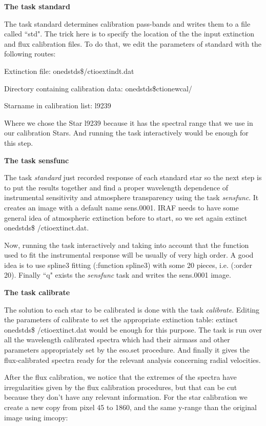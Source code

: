 \textbf{The task standard}

The task standard determines calibration pass-bands and writes them to a file called ``std". The trick here is to specify the location of the the input extinction and flux calibration files. To do that, we edit the parameters of standard with the following routes:

Extinction file:                              onedstds\$/ctioextindt.dat

Directory containing calibration data:   onedstds\$ctionewcal/

Starname in calibration list:                l9239

Where we chose the Star l9239 because it has the spectral range that we use in our calibration Stars. And running the task interactively would be enough for this step.

\textbf{The task sensfunc}

The task \textit{standard} just recorded response of each standard star so the next step is to put the results together and find a proper wavelength dependence of instrumental sensitivity and atmosphere transparency using the task \textit{sensfunc}. It creates an image with a default name sens.0001. IRAF needs to have some general idea of atmospheric extinction before to start, so we set again extinct onedstds\$ /ctioextinct.dat.

Now, running the task interactively and taking into account that the function used to fit the instrumental response will be usually of very high order. A good idea is to use spline3 fitting (:function spline3) with some 20 pieces, i.e. (:order 20).
Finally ``q" exists the \textit{sensfunc} task and writes the sens.0001 image.

\textbf{The task calibrate}

The solution to each star to be calibrated is done with the task \textit{calibrate}. Editing the parameters of calibrate to set the appropriate extinction table: extinct onedstds\$ /ctioextinct.dat would be enough for this purpose. The task is run over all the wavelength calibrated spectra which had their airmass and other parameters appropriately set by the eso.set procedure. And finally it gives the flux-calibrated spectra ready for the relevant analysis concerning radial velocities.

After the flux calibration, we notice that the extremes of the spectra have irregularities given by the flux calibration procedures, but that can be cut because they don't have any relevant information. For the star calibration we create a new copy from pixel 45 to 1860, and the same y-range than the original image using imcopy:

